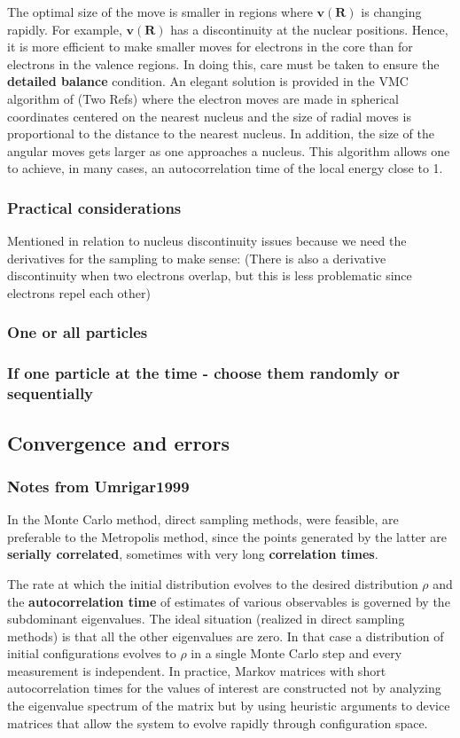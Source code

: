 \documentclass[twoside,english]{uiofysmaster}
\begin{document}
The optimal size of the move is smaller in regions where $\bm{v}(\bm{R})$ is changing rapidly. For example, $\bm{v}(\bm{R})$ has a discontinuity at the nuclear positions. Hence, it is more efficient to make smaller moves for electrons in the core than for electrons in the valence regions. In doing this, care must be taken to ensure the \textbf{detailed balance} condition. An elegant solution is provided in the VMC algorithm of (Two Refs) where the electron moves are made in spherical coordinates centered on the nearest nucleus and the size of radial moves is proportional to the distance to the nearest nucleus.
In addition, the size of the angular moves gets larger as one approaches a nucleus. This algorithm allows one to achieve, in many cases, an autocorrelation time of the local energy close to 1.
\cite{Toulouse2016}

\subsubsection{Practical considerations}
Mentioned in relation to nucleus discontinuity issues because we need the derivatives for the sampling to make sense: (There is also a derivative discontinuity when two electrons overlap, but this is less problematic since electrons repel each other)
\cite{Umrigar1999}

\subsubsection{One or all particles}
\subsubsection{If one particle at the time - choose them randomly or sequentially}
\subsection{Convergence and errors}
\subsubsection{Notes from Umrigar1999}
In the Monte Carlo method, direct sampling methods, were feasible, are preferable to the Metropolis method, since the points generated by the latter are \textbf{serially correlated}, sometimes with very long \textbf{correlation times}. 

The rate at which the initial distribution evolves to the desired distribution $\rho$ and the \textbf{autocorrelation time} of estimates of various observables is governed by the subdominant eigenvalues. The ideal situation (realized in direct sampling methods) is that all the other eigenvalues are zero. In that case a distribution of initial configurations evolves to $\rho$ in a single Monte Carlo step and every measurement is independent. In practice, Markov matrices with short autocorrelation times for the values of interest are constructed not by analyzing the eigenvalue spectrum of the matrix but by using heuristic arguments to device matrices that allow the system to evolve rapidly through configuration space.
\end{document}

